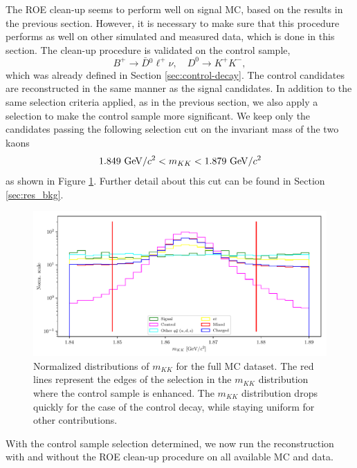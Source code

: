 The ROE clean-up seems to perform well on signal MC, based on the results in the previous section. However, it is necessary to make sure that this procedure performs as well on other simulated and measured data, which is done in this section. The clean-up procedure is validated on the control sample, $$B^+ \to \bar D {}^0 \ell^+ \nu,\quad D^0 \to K^+K^-,$$
which was already defined in Section \ref{sec:control-decay}. The control candidates are reconstructed in the same manner as the signal candidates. In addition to the same selection criteria applied, as in the previous section, we also apply a selection to make the control sample more significant. We keep only the candidates passing the following selection cut on the invariant mass of the two kaons
\begin{equation}
1.849\mathrm{~GeV}/c^2 < m_{KK} < 1.879\mathrm{~GeV}/c^2
\end{equation}
as shown in Figure \ref{fig:roe_mKK}. Further detail about this cut can be found in Section \ref{sec:res_bkg}.
\begin{figure}[H]
	\centering
	\captionsetup{width=0.8\linewidth}
	\includegraphics[width=\linewidth]{fig/roe_mKK_cut}
	\caption{Normalized distributions of $m_{KK}$ for the full MC dataset. The red lines represent the edges of the selection in the $m_{KK}$ distribution where the control sample is enhanced. The $m_{KK}$ distribution drops quickly for the case of the control decay, while staying uniform for other contributions.}
	\label{fig:roe_mKK}
\end{figure}

With the control sample selection determined, we now run the reconstruction with and without the ROE clean-up procedure on all available MC and data.

